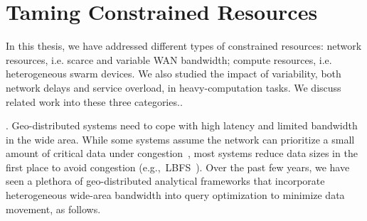\documentclass[thesis.tex]{subfiles}
\begin{document}


\section{Taming Constrained Resources}
\label{sec:taming-constr-reso}

In this thesis, we have addressed different types of constrained resources:
network resources, i.e. scarce and variable WAN bandwidth; compute resources,
i.e. heterogeneous swarm devices. We also studied the impact of variability,
both network delays and service overload, in heavy-computation tasks. We discuss
related work into these three categories..

. Geo-distributed systems need to cope
with high latency and limited bandwidth in the wide area. While some systems
assume the network can prioritize a small amount of critical data under
congestion~\cite{cho2012surviving}, most systems reduce data sizes in the first
place to avoid congestion (e.g.,~LBFS~\cite{muthitacharoen2001low}). Over the
past few years, we have seen a plethora of geo-distributed analytical frameworks
that incorporate heterogeneous wide-area bandwidth into query optimization to
minimize data movement, as follows.
\end{document}
